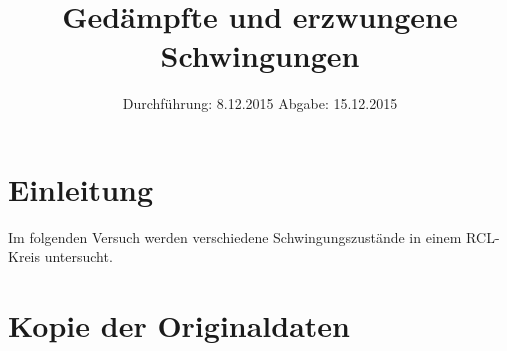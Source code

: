 

\subject{V354}
\title{Gedämpfte und erzwungene Schwingungen}
\date{
  Durchführung: 8.12.2015
  \hspace{3em}
  Abgabe: 15.12.2015
}



\maketitle
\thispagestyle{empty}
\tableofcontents
\newpage

\section{Einleitung}
Im folgenden Versuch werden verschiedene Schwingungszustände in einem RCL-Kreis
untersucht.






\printbibliography

\appendix
\section{Kopie der Originaldaten}


